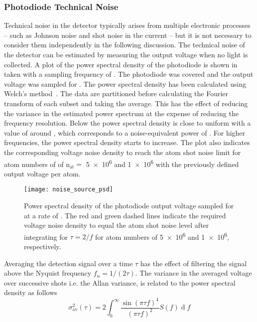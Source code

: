 \subsubsection{Photodiode Technical Noise}
Technical noise in the detector typically arises from multiple electronic processes -- such as Johnson noise and shot noise in
the current -- but it is not necessary to consider them independently
in the following discussion. The technical noise of the detector can
be estimated by measuring the output voltage when no light is
collected. A plot of the power spectral density of the photodiode is shown in~ taken
with a sampling frequency of . The
photodiode was covered and the output voltage was sampled for
. The power spectral density has been calculated
using Welch's method~\cite{Welch1967}. The data are partitioned before
calculating the Fourier transform of each subset and taking the
average. This has the effect of reducing the variance in the estimated
power spectrum at the expense of reducing the frequency resolution.
Below  the power spectral density is close
to uniform with a value of around
, which corresponds to a
noise-equivalent power of .
For higher frequencies, the power spectral density starts to
increase. The plot also indicates the corresponding voltage noise
density to reach the
atom shot noise limit for atom numbers of 
of n\(_\text{at} =\) \num{5e6} and \num{1e6} with the previously
defined output voltage per atom. 
\begin{figure}[htpb!]
  \centering
  \texttt{[image: noise\_source\_psd]}
  \caption[Photodiode power spectral density]{Power spectral density of the photodiode output voltage
  sampled for  at a rate of
. The red and green dashed lines indicate
the required voltage noise density to equal the atom shot noise level
after integrating for \(\tau = 2/f\)\sivalue{}{\s} for atom numbers of
\num{5e6} and \num{1e6}, respectively.}
  \label{fig:noise_source_psd}
\end{figure}
Averaging the detection signal over a time \(\tau\) has the effect of
filtering the signal above the Nyquist frequency \(f_n = 1/(2 \tau)\).
The variance in the averaged voltage over successive shots
i.e. the Allan variance, is related to the power spectral density as
follows
\begin{equation}
  \sigma^2_\text{av}(\tau) = 2 \int_0^\infty \frac{\sin(\pi \tau f)^4}{(\pi \tau f)^2}S(f)\;\mathrm{d}\;f
  \label{eq:av_psd}
\end{equation}

